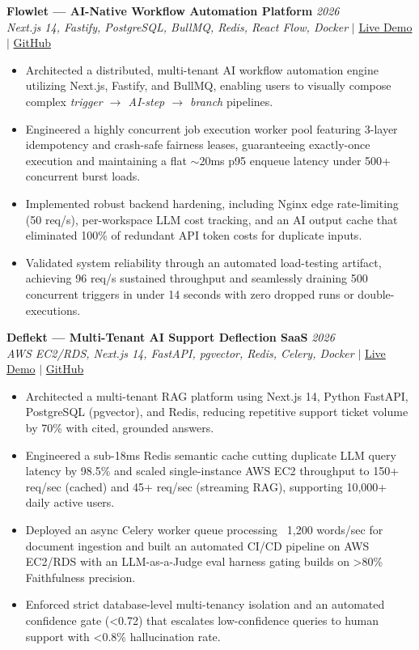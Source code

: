 \documentclass[11pt, a4paper]{article}
\begin{document}
\textbf{Flowlet — AI-Native Workflow Automation Platform} \hfill \textit{2026} \\
\textit{Next.js 14, Fastify, PostgreSQL, BullMQ, Redis, React Flow, Docker} $|$ \href{http://flowlet-automate.vercel.app/}{Live Demo} $|$ \href{https://github.com/SShayanHussain/flowlet}{GitHub}
\begin{itemize}[leftmargin=0.25in, itemsep=2pt]
    \item Architected a distributed, multi-tenant AI workflow automation engine utilizing Next.js, Fastify, and BullMQ, enabling users to visually compose complex \textit{trigger $\rightarrow$ AI-step $\rightarrow$ branch} pipelines.
    \item Engineered a highly concurrent job execution worker pool featuring 3-layer idempotency and crash-safe fairness leases, guaranteeing exactly-once execution and maintaining a flat $\sim$20ms p95 enqueue latency under 500+ concurrent burst loads.
    \item Implemented robust backend hardening, including Nginx edge rate-limiting (50 req/s), per-workspace LLM cost tracking, and an AI output cache that eliminated 100\% of redundant API token costs for duplicate inputs.
    \item Validated system reliability through an automated load-testing artifact, achieving 96 req/s sustained throughput and seamlessly draining 500 concurrent triggers in under 14 seconds with zero dropped runs or double-executions.
\end{itemize}

\textbf{Deflekt — Multi-Tenant AI Support Deflection SaaS} \hfill \textit{2026} \\
\textit{AWS EC2/RDS, Next.js 14, FastAPI, pgvector, Redis, Celery, Docker} $|$ \href{http://54.208.178.218/}{Live Demo} $|$ \href{https://github.com/SShayanHussain/deflekt}{GitHub}
\begin{itemize}[leftmargin=0.25in, itemsep=2pt]
    \item Architected a multi-tenant RAG platform using Next.js 14, Python FastAPI, PostgreSQL (pgvector), and Redis, reducing repetitive support ticket volume by 70\% with cited, grounded answers.
    \item Engineered a sub-18ms Redis semantic cache cutting duplicate LLM query latency by 98.5\% and scaled single-instance AWS EC2 throughput to 150+ req/sec (cached) and 45+ req/sec (streaming RAG), supporting 10,000+ daily active users.
    \item Deployed an async Celery worker queue processing ~1,200 words/sec for document ingestion and built an automated CI/CD pipeline on AWS EC2/RDS with an LLM-as-a-Judge eval harness gating builds on >80\% Faithfulness precision.
    \item Enforced strict database-level multi-tenancy isolation and an automated confidence gate (<0.72) that escalates low-confidence queries to human support with <0.8\% hallucination rate.
\end{itemize}
\end{document}
